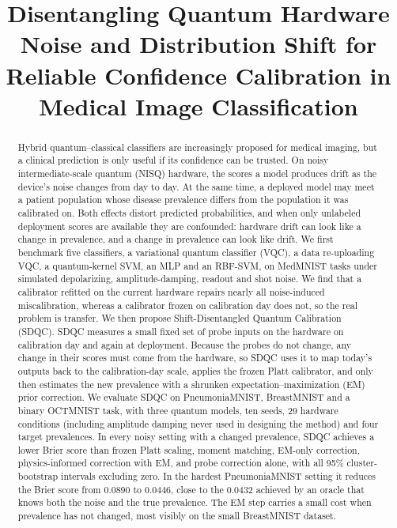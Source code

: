 \documentclass[conference]{IEEEtran}
\begin{document}
\title{Disentangling Quantum Hardware Noise and Distribution Shift for Reliable Confidence Calibration in Medical Image Classification}

\author{
}

\maketitle

\begin{abstract}
Hybrid quantum--classical classifiers are increasingly proposed for medical imaging, but a clinical prediction is only useful if its confidence can be trusted. On noisy intermediate-scale quantum (NISQ) hardware, the scores a model produces drift as the device's noise changes from day to day. At the same time, a deployed model may meet a patient population whose disease prevalence differs from the population it was calibrated on. Both effects distort predicted probabilities, and when only unlabeled deployment scores are available they are confounded: hardware drift can look like a change in prevalence, and a change in prevalence can look like drift. We first benchmark five classifiers, a variational quantum classifier (VQC), a data re-uploading VQC, a quantum-kernel SVM, an MLP and an RBF-SVM, on MedMNIST tasks under simulated depolarizing, amplitude-damping, readout and shot noise. We find that a calibrator refitted on the current hardware repairs nearly all noise-induced miscalibration, whereas a calibrator frozen on calibration day does not, so the real problem is transfer. We then propose Shift-Disentangled Quantum Calibration (SDQC). SDQC measures a small fixed set of probe inputs on the hardware on calibration day and again at deployment. Because the probes do not change, any change in their scores must come from the hardware, so SDQC uses it to map today's outputs back to the calibration-day scale, applies the frozen Platt calibrator, and only then estimates the new prevalence with a shrunken expectation--maximization (EM) prior correction. We evaluate SDQC on PneumoniaMNIST, BreastMNIST and a binary OCTMNIST task, with three quantum models, ten seeds, 29 hardware conditions (including amplitude damping never used in designing the method) and four target prevalences. In every noisy setting with a changed prevalence, SDQC achieves a lower Brier score than frozen Platt scaling, moment matching, EM-only correction, physics-informed correction with EM, and probe correction alone, with all 95\% cluster-bootstrap intervals excluding zero. In the hardest PneumoniaMNIST setting it reduces the Brier score from 0.0890 to 0.0446, close to the 0.0432 achieved by an oracle that knows both the noise and the true prevalence. The EM step carries a small cost when prevalence has not changed, most visibly on the small BreastMNIST dataset.
\end{abstract}
\end{document}
